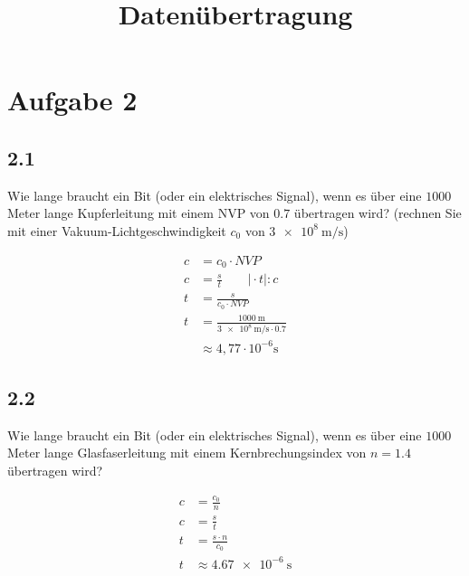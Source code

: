 



    \vspace{2cm}
    
    \title{Datenübertragung}
    
    \vspace{1cm}
    \maketitle
    \thispagestyle{empty}
    \newpage

    \section*{Aufgabe 2}
    \subsection*{2.1}
    Wie lange braucht ein Bit (oder ein elektrisches Signal), wenn es über eine $1000$ Meter lange Kupferleitung mit
    einem NVP von $0.7$ übertragen wird? (rechnen Sie mit einer Vakuum-Lichtgeschwindigkeit $c_0$ von $ \SI{3e8}{\meter\per\second}$)

    \begin{align}
        c &= c_0 \cdot NVP\\
        c &= \frac{s}{t}  \qquad \vert \cdot t \vert:c\\
        t &= \frac{s}{c_0 \cdot NVP}\\
        t &= \frac{\SI{1000}{\meter}}{\SI{3e8}{\meter\per\second}\cdot 0.7}\\
        &\approx 4,77 \cdot 10^{-6} \si{\second}
    \end{align}

    \subsection*{2.2}
    Wie lange braucht ein Bit (oder ein elektrisches Signal), wenn es über eine $1000$ Meter lange Glasfaserleitung mit
    einem Kernbrechungsindex von $n = 1.4$ übertragen wird? 

    \begin{align}
        c &= \frac{c_0}{n} \\
        c &= \frac{s}{t} \\
        t &= \frac{s\cdot n}{c_0}\\
        t &\approx \SI{4.67e-6}{\second}
    \end{align}
    
